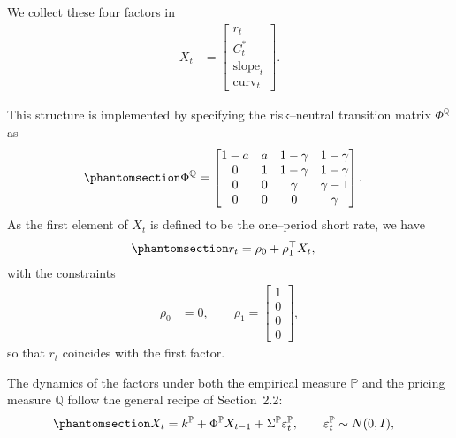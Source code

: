 \documentclass[
  letterpaper,
  DIV=11,
  numbers=noendperiod]{scrreprt}
\begin{document}
We collect these four factors in
\begin{align}
X_t
&=
\left[
\begin{array}{c}
r_t \\
C^{*}_t \\
\text{slope}_t \\
\text{curv}_t
\end{array}
\right].
\end{align}

This structure is implemented by specifying the risk--neutral transition
matrix \(\Phi^{\mathbb{Q}}\) as
\begin{equation}\protect\phantomsection\label{eq-trm-PhiQ}{
\begin{align}
\Phi^{\mathbb{Q}}
&=
\begin{bmatrix}
1-a & a & 1-\gamma & 1-\gamma \\
0   & 1 & 1-\gamma & 1-\gamma \\
0   & 0 & \gamma   & \gamma-1 \\
0   & 0 & 0        & \gamma
\end{bmatrix}.
\end{align}
}\end{equation} As the first element of \(X_t\) is defined to be the
one--period short rate, we have
\begin{equation}\protect\phantomsection\label{eq-shortRate-2}{
\begin{align}
r_t &= \rho_0 + \rho_1^{\top} X_t,
\end{align}
}\end{equation} with the constraints
\begin{align}
\rho_0 &= 0, \qquad
\rho_1 =
\left[
\begin{array}{c}
1 \\ 0 \\ 0 \\ 0
\end{array}
\right],
\end{align}
so that \(r_t\) coincides with the first factor.

The dynamics of the factors under both the empirical measure
\(\mathbb{P}\) and the pricing measure \(\mathbb{Q}\) follow the general
recipe of Section~2.2:
\begin{equation}\protect\phantomsection\label{eq-factorVarP-2}{
\begin{align}
X_t &= k^{\mathbb{P}} + \Phi^{\mathbb{P}} X_{t-1}
        + \Sigma^{\mathbb{P}} \varepsilon_t^{\mathbb{P}},
        \qquad \varepsilon_t^{\mathbb{P}} \sim N(0,I), 
\end{align}
}\end{equation}
\end{document}
